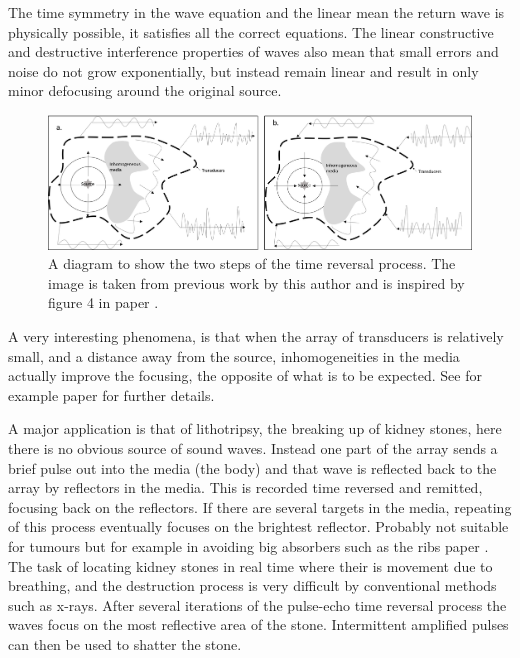 \documentclass[11pt]{article} %
\begin{document}
\begin{itemize}
		The time symmetry in the wave equation and the linear mean the return wave is physically possible, it satisfies all the correct equations. The linear constructive and destructive interference properties of waves also mean that small errors and noise do not grow exponentially, but instead remain linear and result in only minor defocusing around the original source.
		\begin{figure}
			\centering
			\includegraphics[width=\linewidth]{"Report_images/Time-reversal cavity"}
			\caption{A diagram to show the two steps of the time reversal process. The image is taken from previous work by this author \cite{Duff2018} and is inspired by figure 4 in paper \cite{Fink1992}.} 
			\label{fig:time-reversal-cavity}
		\end{figure}
		
		A very interesting phenomena, is that when the array of transducers is relatively small, and a distance away from the source, inhomogeneities in the media actually improve the focusing, the opposite of what is to be expected. See for example paper \cite{Borcea2002} for further details. 
		
		A major application is that of lithotripsy, the breaking up of kidney stones, here there is no obvious source of sound waves. Instead one part of the array sends a brief pulse out into the media (the body) and that wave is reflected back to the array by reflectors in the media. This is recorded time reversed and remitted, focusing back on the reflectors. If there are several targets in the media, repeating of this process eventually focuses on the brightest reflector. 
		Probably not suitable for tumours but for example in avoiding big absorbers such as the ribs  paper \cite{Cochard2009}. The task of locating kidney stones in real time where their is movement due to breathing, and the destruction process is very difficult by conventional methods such as x-rays. After several iterations of the pulse-echo time reversal process the  waves focus on the most reflective area of the stone. Intermittent amplified pulses can then be used to shatter the stone. 
		

\end{itemize}
\end{document}
